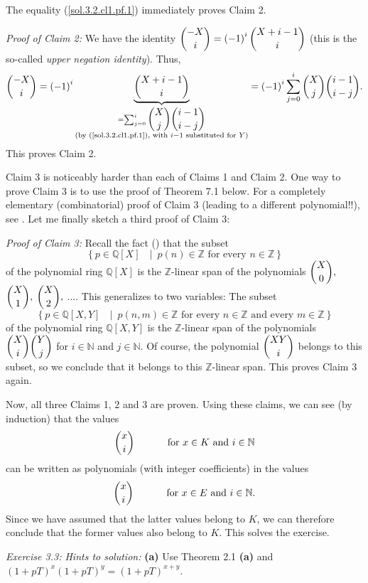 \documentclass[numbers=enddot,12pt,final,onecolumn,notitlepage]{scrartcl}%
\begin{document}
The equality (\ref{sol.3.2.cl1.pf.1}) immediately proves Claim 2.

\textit{Proof of Claim 2:} We have the identity $\dbinom{-X}{i}=\left(
-1\right)  ^{i}\dbinom{X+i-1}{i}$ (this is the so-called \textit{upper
negation identity}). Thus,%
\[
\dbinom{-X}{i}=\left(  -1\right)  ^{i}\underbrace{\dbinom{X+i-1}{i}%
}_{\substack{=\sum_{j=0}^{i}\dbinom{X}{j}\dbinom{i-1}{i-j}\\\text{(by
(\ref{sol.3.2.cl1.pf.1}), with }i-1\text{ substituted for }Y\text{)}}}=\left(
-1\right)  ^{i}\sum_{j=0}^{i}\dbinom{X}{j}\dbinom{i-1}{i-j}.
\]
This proves Claim 2.

Claim 3 is noticeably harder than each of Claims 1 and Claim 2. One way to
prove Claim 3 is to use the proof of Theorem 7.1 below. For a completely
elementary (combinatorial) proof of Claim 3 (leading to a different
polynomial!!), see \cite[Exercise 3]{Grin-detn}. Let me finally sketch a third
proof of Claim 3:

\textit{Proof of Claim 3:} Recall the fact (\cite[Proposition I.7.3]{Harts77})
that the subset%
\[
\left\{  p\in\mathbb{Q}\left[  X\right]  \text{ }\mid\ p\left(  n\right)
\in\mathbb{Z}\text{ for every }n\in\mathbb{Z}\right\}
\]
of the polynomial ring $\mathbb{Q}\left[  X\right]  $ is the $\mathbb{Z}%
$-linear span of the polynomials $\dbinom{X}{0},$ $\dbinom{X}{1},$ $\dbinom
{X}{2},$ $...$. This generalizes to two variables: The subset
\[
\left\{  p\in\mathbb{Q}\left[  X,Y\right]  \text{ }\mid\ p\left(  n,m\right)
\in\mathbb{Z}\text{ for every }n\in\mathbb{Z}\text{ and every }m\in
\mathbb{Z}\right\}
\]
of the polynomial ring $\mathbb{Q}\left[  X,Y\right]  $ is the $\mathbb{Z}%
$-linear span of the polynomials $\dbinom{X}{i}\dbinom{Y}{j}$ for
$i\in\mathbb{N}$ and $j\in\mathbb{N}$. Of course, the polynomial $\dbinom
{XY}{i}$ belongs to this subset, so we conclude that it belongs to this
$\mathbb{Z}$-linear span. This proves Claim 3 again.

Now, all three Claims 1, 2 and 3 are proven. Using these claims, we can see
(by induction) that the values%
\[
\dbinom{x}{i}\ \ \ \ \ \ \ \ \ \ \text{for }x\in K\text{ and }i\in\mathbb{N}%
\]
can be written as polynomials (with integer coefficients) in the values%
\[
\dbinom{x}{i}\ \ \ \ \ \ \ \ \ \ \text{for }x\in E\text{ and }i\in\mathbb{N}.
\]
Since we have assumed that the latter values belong to $K$, we can therefore
conclude that the former values also belong to $K$. This solves the exercise.

\textit{Exercise 3.3: Hints to solution:} \textbf{(a)} Use Theorem 2.1
\textbf{(a)} and $\left(  1+pT\right)  ^{x}\left(  1+pT\right)  ^{y}=\left(
1+pT\right)  ^{x+y}$.
\end{document}
